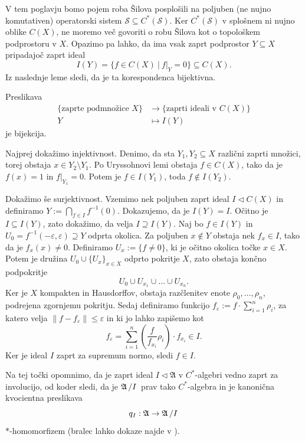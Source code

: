 V tem poglavju bomo pojem roba Šilova posplošili na
poljuben (ne nujno komutativen) operatorski sistem $\mathcal{S} \subseteq C^*(\mathcal{S})$.
Ker $C^*(\mathcal{S})$ v splošnem ni nujno oblike $C(X)$, ne moremo več govoriti o robu Šilova kot o topološkem podprostoru v $X$.
Opazimo pa lahko, da ima vsak zaprt podprostor $Y \subseteq X$ pripadajoč zaprt ideal 
$$I(Y) = \{f \in C(X)\ |\ f|_{Y} = 0\} \subseteq C(X).$$
Iz naslednje leme sledi, da je ta korespondenca bijektivna.
\begin{lema}\label{lem:aux}
    Preslikava
    \begin{align*}
        \{\text{zaprte podmnožice $X$}\} &\to \{ \text{zaprti ideali v $C(X)$} \}\\
        Y &\mapsto I(Y) 
\end{align*}
    je bijekcija.
\end{lema}

\begin{dokaz}
    Najprej dokažimo injektivnost. Denimo, da sta $Y_1, Y_2 \subseteq X$
    različni zaprti množici, torej obstaja $x \in Y_2 \setminus Y_1$.
    Po Uryssohnovi lemi obstaja $f \in C(X)$,
    tako da je $f(x) = 1$ in $f|_{Y_1} = 0$. 
    Potem je $f \in I(Y_1)$, toda $f \notin I(Y_2)$.

    Dokažimo še surjektivnost. Vzemimo nek poljuben zaprt ideal $I \lhd C(X)$ in definiramo 
    $Y := \bigcap_{f \in I} f^{-1} (0)$. Dokazujemo, da je $I(Y) = I$.
    Očitno je $I \subseteq I(Y)$, zato dokažimo, da velja $I \supseteq I(Y)$.
    Naj bo $f \in I(Y)$ in $U_0 = f^{-1} (-\varepsilon, \varepsilon) \supseteq Y$ odprta okolica.
    Za poljuben $x \notin Y$ obstaja nek $f_x \in I$, tako da je $f_x (x) \neq 0$.
    Definiramo $U_x := \{f \neq 0\}$, ki je očitno okolica točke $x \in X$.
    Potem je družina $U_0 \cup \{U_x\}_{x \in X}$ odprto pokritje $X$, zato obstaja končno podpokritje
    $$U_0 \cup U_{x_1} \cup \dots \cup U_{x_n}.$$ Ker je $X$ kompakten in Hausdorffov, obstaja 
    razčlenitev enote $\rho_0, \dots, \rho_n$, podrejena zgornjemu pokritju.
    Sedaj definiramo funkcijo $f_{\varepsilon} := f \cdot \sum_{i = 1} ^n \rho_i$, za katero velja $\| f - f_{\varepsilon}\| \leq \varepsilon$ in ki jo lahko zapišemo kot
    $$f_{\varepsilon} = \sum_{i = 1} ^n \left( \frac{f}{f_{x_i}} \rho_i \right) \cdot f_{x_i} \in I.$$
    Ker je ideal $I$ zaprt za supremum normo, sledi $f \in I$.     
\end{dokaz}

\begin{opomba}
    Na tej točki opomnimo, da je zaprt ideal $I \lhd \mathfrak{A}$ v $C^*$-algebri vedno zaprt za involucijo, od koder sledi,
    da je $\quot{\mathfrak{A}}{I}$ prav tako $C^*$-algebra in je kanonična kvocientna preslikava 
    $$q_I : \mathfrak{A} \to \quot{\mathfrak{A}}{I}$$
    $*$-homomorfizem (bralec lahko dokaze najde v \cite[Section VIII.4, str. 245-248]{conway1990}).    
\end{opomba}

